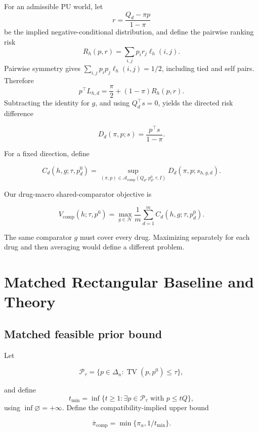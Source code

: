 \documentclass[preprint,review,12pt]{elsarticle}
\newcommand{\Acomp}{\mathcal{A}_{\mathrm{comp}}}
\newcommand{\Hlib}{\mathcal{H}}
\newcommand{\TV}{\operatorname{TV}}
\begin{document}
For an admissible PU world, let
\[
r=\frac{Q_d-\pi p}{1-\pi}
\]
be the implied negative-conditional distribution, and define the pairwise
ranking risk
\[
R_h(p,r)=\sum_{i,j}p_i r_j\ell_h(i,j).
\]
Pairwise symmetry gives
\(\sum_{i,j}p_i p_j\ell_h(i,j)=1/2\), including tied and self pairs. Therefore
\[
p^\top L_{h,d}=\frac{\pi}{2}+(1-\pi)R_h(p,r).
\]
Subtracting the identity for \(g\), and using \(Q_d^\top s=0\), yields the
directed risk difference

\begin{equation}
D_d(\pi,p;s)=\frac{p^\top s}{1-\pi}.
\label{eq:risk-difference}
\end{equation}

For a fixed direction, define

\begin{equation}
C_d(h,g;\tau,p_d^0)=
\sup_{(\pi,p)\in\Acomp(Q_d,p_d^0,\tau,I)}
D_d(\pi,p;s_{h,g,d}).
\label{eq:directed-oracle}
\end{equation}

Our drug-macro shared-comparator objective is

\begin{equation}
V_{\mathrm{comp}}(h;\tau,p^0)=
\max_{g\in\Hlib}\frac1m\sum_{d=1}^{m}
C_d(h,g;\tau,p_d^0).
\label{eq:shared-comparator}
\end{equation}

The same comparator \(g\) must cover every drug. Maximizing separately for each
drug and then averaging would define a different problem.

\section{Matched Rectangular Baseline and Theory}

\subsection{Matched feasible prior bound}

Let

\begin{equation}
\mathcal{P}_\tau=\{p\in\Delta_n:\TV(p,p^0)\leq\tau\},
\end{equation}

and define
\[
t_{\min}=\inf\{t\geq1:\exists p\in\mathcal{P}_\tau
\text{ with }p\leq tQ\},
\]
using \(\inf\varnothing=+\infty\). Define the compatibility-implied upper bound

\begin{equation}
\bar\pi_{\mathrm{comp}}=\min\{\pi_u,1/t_{\min}\}.
\label{eq:pi-upper}
\end{equation}
\end{document}
